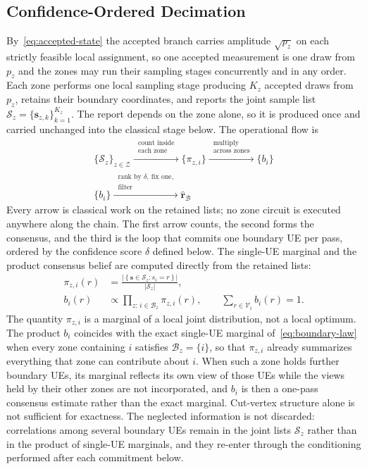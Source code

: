 \documentclass[journal]{IEEEtran}
\newcommand{\calV}{\mathcal{V}}  %
\newcommand{\calZ}{\mathcal{Z}}  %
\newcommand{\calB}{\mathcal{B}}  %
\newcommand{\calS}{\mathcal{S}}  %
\begin{document}
\subsection{Confidence-Ordered Decimation}
\label{sec:reconciliation}

By~\eqref{eq:accepted-state} the accepted branch carries amplitude $\sqrt{p_z}$ on each strictly feasible local assignment, so one accepted measurement is one draw from $p_z$ and the zones may run their sampling stages concurrently and in any order. Each zone performs one local sampling stage producing $K_z$ accepted draws from $p_z$, retains their boundary coordinates, and reports the joint sample list $\calS_z=\{\bm s_{z,k}\}_{k=1}^{K_z}$. The report depends on the zone alone, so it is produced once and carried unchanged into the classical stage below. The operational flow is
\begin{equation}
\label{eq:decimation-map}
\boxed{
\begin{gathered}
\{\calS_z\}_{z\in\calZ}
\xrightarrow{\ \substack{\text{count inside}\\\text{each zone}}\ }
\{\pi_{z,i}\}
\xrightarrow{\ \substack{\text{multiply}\\\text{across zones}}\ }
\{b_i\}\\[8pt]
\{b_i\}
\xrightarrow{\ \substack{\text{rank by }\delta,\ \text{fix one,}\\\text{filter}}\ }
\widehat{\bm r}_{\calB}
\end{gathered}}
\end{equation}
Every arrow is classical work on the retained lists; no zone circuit is executed anywhere along the chain. The first arrow counts, the second forms the consensus, and the third is the loop that commits one boundary UE per pass, ordered by the confidence score $\delta$ defined below. The single-UE marginal and the product consensus belief are computed directly from the retained lists:
\begin{equation}
\label{eq:belief}
\begin{aligned}
\pi_{z,i}(r)
&=
\frac{\left|\left\{\bm s\in\calS_z:s_i=r\right\}\right|}{|\calS_z|},\\
b_i(r)
&\propto
\prod_{z:\,i\in\calB_z}\pi_{z,i}(r),
\qquad
\sum_{r\in\calV_i}b_i(r)=1.
\end{aligned}
\end{equation}
The quantity $\pi_{z,i}$ is a marginal of a local joint distribution, not a local optimum. The product $b_i$ coincides with the exact single-UE marginal of~\eqref{eq:boundary-law} when every zone containing $i$ satisfies $\calB_z=\{i\}$, so that $\pi_{z,i}$ already summarizes everything that zone can contribute about $i$. When such a zone holds further boundary UEs, its marginal reflects its own view of those UEs while the views held by their other zones are not incorporated, and $b_i$ is then a one-pass consensus estimate rather than the exact marginal. Cut-vertex structure alone is not sufficient for exactness. The neglected information is not discarded: correlations among several boundary UEs remain in the joint lists $\calS_z$ rather than in the product of single-UE marginals, and they re-enter through the conditioning performed after each commitment below.
\end{document}
